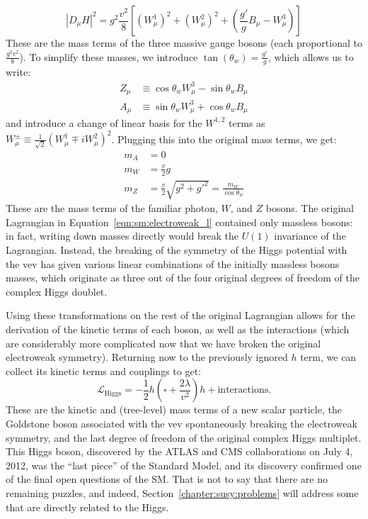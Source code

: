 %
\begin{equation}
|D_\mu H|^2 = g^2 \frac{v^2}{8} \left[ (W_\mu^1)^2 + (W_\mu^2)^2 + \left( \frac{g'}{g} B_\mu - W_\mu^3 \right) \right]
\end{equation}
%
These are the mass terms of the three massive gauge bosons (each proportional to $\frac{g^2 v^2}{8}$). To simplify these masses, we introduce $\tan(\theta_w) = \frac{g'}{g}$, which allows us to write:
%
\begin{align}
Z_\mu &\equiv \cos \theta_w W_\mu^3 - \sin \theta_w B_\mu\\
A_\mu &\equiv \sin \theta_w W_\mu^3 + \cos \theta_w B_\mu
\end{align}
%
and introduce a change of linear basis for the $W^{1,2}$ terms as $W_\mu^{\pm} \equiv \frac{1}{\sqrt{2}} (W_\mu^1 \mp i W_\mu^2)^2$. Plugging this into the original mass terms, we get:
%
\begin{align}
m_A &= 0\\
m_W &= \frac{v}{2} g\\
m_Z &= \frac{v}{2} \sqrt{g^2 +g'^2} = \frac{m_W}{\cos \theta_w}
\end{align}
%
These are the mass terms of the familiar photon, $W$, and $Z$ bosons. The original Lagrangian in Equation~\ref{eqn:sm:electroweak_l} contained only massless bosons: in fact, writing down masses directly would break the $U(1)$ invariance of the Lagrangian.  Instead, the breaking of the symmetry of the Higgs potential with the vev has given various linear combinations of the initially massless bosons masses, which originate as three out of the four original degrees of freedom of the complex Higgs doublet. 

Using these transformations on the rest of the original Lagrangian allows for the derivation of the kinetic terms of each boson, as well as the interactions (which are considerably more complicated now that we have broken the original electroweak symmetry). Returning now to the previously ignored $h$ term, we can collect its kinetic terms and couplings to get:
%
\begin{equation}
\mathcal{L}_\mathrm{Higgs} = - \frac{1}{2} h \left(\square + \frac{2\lambda}{v^2}\right) h + \mathrm{interactions}.
\end{equation}
%
These are the kinetic and (tree-level) mass terms of a new scalar particle, the Goldstone boson associated with the vev spontaneously breaking the electroweak symmetry, and the last degree of freedom of the original complex Higgs multiplet. This Higgs boson, discovered by the ATLAS and CMS collaborations on July 4, 2012, was the ``last piece'' of the Standard Model, and its discovery confirmed one of the final open questions of the SM. That is not to say that there are no remaining puzzles, and indeed, Section~\ref{chapter:susy:problems} will address some that are directly related to the Higgs.

